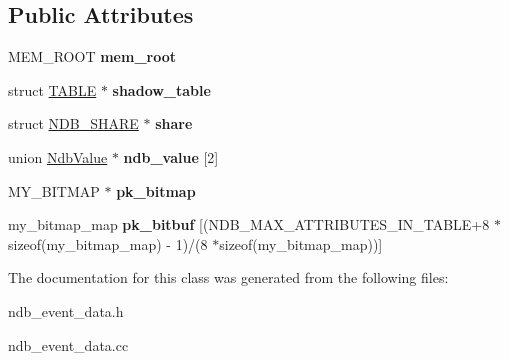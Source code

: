 \subsection*{Public Attributes}
\begin{DoxyCompactItemize}
\item 
\mbox{\label{classNdb__event__data_a5e4a930c7fa3e15ca0a1120deca4e752}} 
M\+E\+M\+\_\+\+R\+O\+OT {\bfseries mem\+\_\+root}
\item 
\mbox{\label{classNdb__event__data_af4ec9643b8eb0f341c07fbfc8bfd525c}} 
struct \mbox{\hyperlink{structTABLE}{T\+A\+B\+LE}} $\ast$ {\bfseries shadow\+\_\+table}
\item 
\mbox{\label{classNdb__event__data_a9c09d8354655fa6992bcfe0091b5123c}} 
struct \mbox{\hyperlink{structNDB__SHARE}{N\+D\+B\+\_\+\+S\+H\+A\+RE}} $\ast$ {\bfseries share}
\item 
\mbox{\label{classNdb__event__data_a9ae9ee70ce57bf7821e93a3fca892f41}} 
union \mbox{\hyperlink{unionNdbValue}{Ndb\+Value}} $\ast$ {\bfseries ndb\+\_\+value} \mbox{[}2\mbox{]}
\item 
\mbox{\label{classNdb__event__data_ab3bf9f18d43b0267a42fcfa889ed7667}} 
M\+Y\+\_\+\+B\+I\+T\+M\+AP $\ast$ {\bfseries pk\+\_\+bitmap}
\item 
\mbox{\label{classNdb__event__data_a60161649356f24181e83030d52edc420}} 
my\+\_\+bitmap\+\_\+map {\bfseries pk\+\_\+bitbuf} \mbox{[}(N\+D\+B\+\_\+\+M\+A\+X\+\_\+\+A\+T\+T\+R\+I\+B\+U\+T\+E\+S\+\_\+\+I\+N\+\_\+\+T\+A\+B\+LE+8 $\ast$sizeof(my\+\_\+bitmap\+\_\+map) -\/ 1)/(8 $\ast$sizeof(my\+\_\+bitmap\+\_\+map))\mbox{]}
\end{DoxyCompactItemize}


The documentation for this class was generated from the following files\+:\begin{DoxyCompactItemize}
\item 
ndb\+\_\+event\+\_\+data.\+h\item 
ndb\+\_\+event\+\_\+data.\+cc\end{DoxyCompactItemize}

